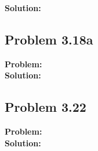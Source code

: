 \documentclass[letter]{article}
\begin{document}
\textbf{Solution:}\\


\subsection{Problem 3.18a}
\textbf{Problem:}\\



\textbf{Solution:}\\


\subsection{Problem 3.22}
\textbf{Problem:}\\



\textbf{Solution:}\\
\end{document}
